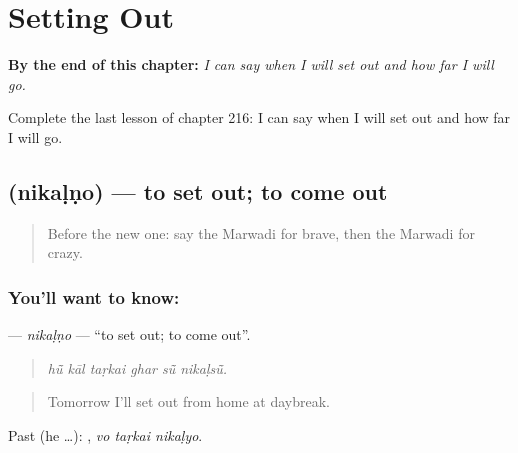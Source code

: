 
\chapter{Setting Out}
\label{ch:mw-setting-out}

\begin{chapteropening}
\textbf{By the end of this chapter:} \emph{I can say when I will set out and how far I will go.}

Complete the last lesson of chapter 216: I can say when I will set out and how far I will go.
\end{chapteropening}

\section[\texorpdfstring{\mw{निकळणो} (nikaḷṇo)}{निकळणो (nikaḷṇo)}]{ (nikaḷṇo) — to set out; to come out}

\label{lesson:MW-C216-nikalno}



\begin{quote}
Before the new one: say the Marwadi for brave, then the Marwadi for crazy.
\end{quote}

\subsection*{You'll want to know: }
\textbf{} — \emph{nikaḷṇo} — \textquotedblleft{}to set out; to come out\textquotedblright{}.

\begin{quote}
     
\end{quote}

\begin{quote}
\emph{hū̃ kāl taṛkai ghar sū̃ nikaḷsū̃.}
\end{quote}

\begin{quote}
Tomorrow I'll set out from home at daybreak.
\end{quote}

Past (he …):   , \emph{vo taṛkai nikaḷyo}.

